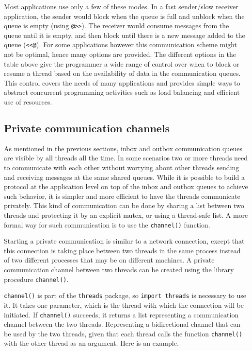 \bigskip

Most applications use only a few of these modes. In a fast sender/slow receiver
application, the sender would block when the queue is full and unblock when the
queue is empty (using \texttt{@>{}>}). The receiver would consume messages from
the queue until it is empty, and then block until there is a new message added
to the queue (\texttt{<{}<@}). For some applications however this communication
scheme might not be optimal, hence many options are provided. The different
options in the table above give the programmer a wide range of control over when
to block or resume a thread based on the availability of data in the
communication queues. This control covers the needs of many applications and
provides simple ways to abstract concurrent programming activities such as load
balancing and efficient use of resources.

\subsection*{Private communication channels}

As mentioned in the previous sections, inbox and outbox communication queues are
visible by all threads all the time. In some scenarios two or more threads need
to communicate with each other without worrying about other threads sending and
receiving messages at the same shared queues. While it is possible to build a
protocol at the application level on top of the inbox and outbox queues to
achieve such behavior, it is simpler and more efficient to have the threads
communicate privately. This kind of communication can be done by sharing a list
between two threads and protecting it by an explicit mutex, or using a
thread-safe list. A more formal way for such communication is to use the
\texttt{channel()} function.

Starting a private communication is similar to a network connection, except that
this connection is taking place between two threads in the same process instead
of two different processes that may be on different machines. A private
communication channel between two threads can be created using the library
procedure \texttt{channel()}.

\texttt{channel()} is part of the \texttt{threads} package, so \texttt{import
  threads} is necessary to use it.  It takes one parameter, which is the thread
with which the connection will be initiated.  If \texttt{channel()} succeeds, it
returns a list representing a communication channel between the two
threads. Representing a bidirectional channel that can be used by the two
threads, given that each thread calls the function \texttt{channel()} with the
other thread as an argument.  Here is an example.


